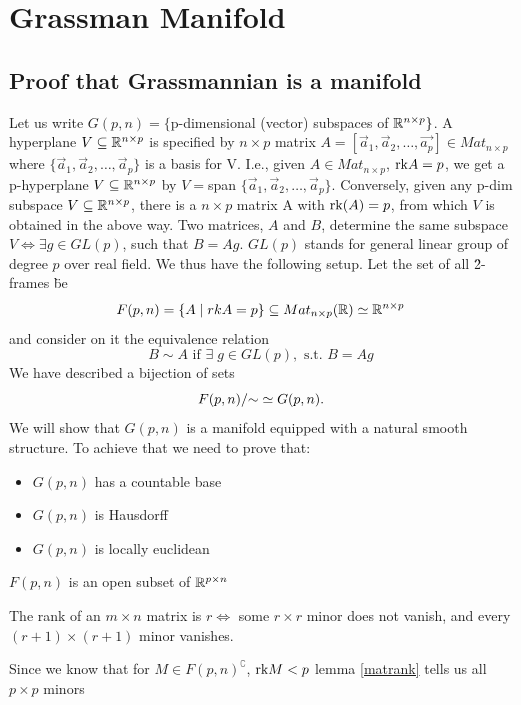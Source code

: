 \documentclass[11pt,a4paper]{report}
\begin{document}
\chapter{Grassman Manifold}
\section{Proof that Grassmannian is a manifold}
Let us write $G(p,n) = \{ $p-dimensional (vector) subspaces of $\mathbb{R}^{n \times p} \}$. A hyperplane $V \subseteq \mathbb{R}^{n \times p}$ is specified by $n \times p$ matrix $A=[\vec{a}_1,\vec{a}_2, \dots, \vec{a_p}] \in Mat_{n\times p}$ where 
$\{\vec{a}_1, \vec{a}_2, \dots , \vec{a}_p \}$ is a basis for V. I.e., given $A \in Mat_{n\times p}$, $\textrm{rk} A = p$, we get a p-hyperplane $V \subseteq \mathbb{R}^{n \times p}$ by $V= $span $\{\vec{a}_1,\vec{a}_2, \dots, \vec{a}_p \} $. Conversely, given any p-dim subspace $V\subseteq \mathbb{R}^{n \times p}$, there is a $n \times p$
matrix A with $\textrm{rk}(A)=p$, from which $V$ is obtained in the above way. Two matrices, $A$ and $B$, determine the same subspace $V \iff \exists g \in GL(p) $, such that $B = A g$. $GL(p)$ stands for general linear group of degree $p$ over real field.
\newline
We thus have the following setup. Let the set of all \" 2-frames \" be
$$ F(p,n) = \{ A \; | \;  rkA=p \} \subseteq Mat_{n \times p}(\mathbb{R})  \simeq \mathbb{R}^{n \times p} $$
and consider on it the equivalence relation
$$ B \sim A \text{ if } \exists \; g \in GL(p), \text{ s.t. } B=Ag $$
We have described a bijection of sets
$$ F(p,n)/{\sim} \simeq  G(p,n). $$ 
We will show that $G(p,n)$ is a manifold equipped with a natural smooth structure. To achieve that we need to prove that:
\begin{itemize}
    \item $G(p,n)$ has a countable base
    \item $G(p,n)$ is Hausdorff
    \item $G(p,n)$ is locally euclidean
\end{itemize}
\begin{Prop}
    $F(p,n)$ is an open subset of $\mathbb{R}^{p \times n}$
\end{Prop}
\begin{Lemma}\label{matrank}
    The rank of an $m \times n$ matrix is $r \iff$ some $r \times r$ minor does not vanish,
    and every $(r+1) \times (r+1)$ minor vanishes.
\end{Lemma}
Since we know that for $M \in F(p,n)^\complement$, $\textrm{rk} M <p$ lemma \ref{matrank} tells us all $p \times p$ minors
\end{document}
